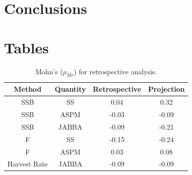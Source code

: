 \documentclass[12pt,halfline,a4paper,nonumbib]{ouparticle}
\begin{document}
\section{Conclusions}

\newpage
\printbibliography

\section{Tables}

\begin{table}[!ht]
\caption{Mohn's ($\rho_{Mr}$) for retrospective analysis.}  
\begin{center}
\label{tab:retro-rho}
\begin{tabular}{|cccc|}
\hline
	\tiny Method	& {\tiny Quantity}  & {\tiny Retrospective} & {\tiny Projection} \\ 
\hline\hline
{\tiny SSB          } & {\tiny SS} 	     & {\tiny    0.04} & {\tiny  0.32}      \\
{\tiny SSB          } & {\tiny ASPM} 	 & {\tiny   -0.03} & {\tiny -0.09}      \\
{\tiny SSB          } & {\tiny JABBA} 	 & {\tiny   -0.09} & {\tiny -0.21}      \\
{\tiny F            } & {\tiny SS} 	     & {\tiny   -0.15} & {\tiny -0.24}      \\
{\tiny F            } & {\tiny ASPM} 	 & {\tiny    0.03} & {\tiny  0.08}      \\
{\tiny Harvest Rate } & {\tiny JABBA} 	 & {\tiny   -0.09} & {\tiny -0.09}      \\
\hline
\end{tabular}
\end{center}
\end{table}
\end{document}
